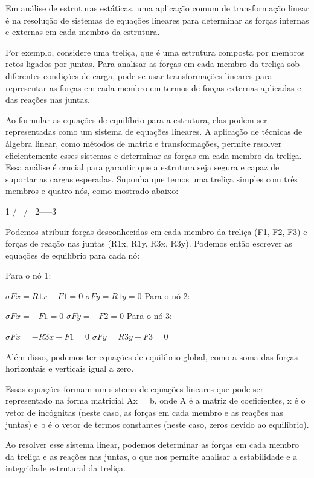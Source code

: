 Em análise de estruturas estáticas, uma aplicação comum de transformação linear é na resolução de sistemas de equações lineares para determinar as forças internas e externas em cada membro da estrutura.

Por exemplo, considere uma treliça, que é uma estrutura composta por membros retos ligados por juntas. Para analisar as forças em cada membro da treliça sob diferentes condições de carga, pode-se usar transformações lineares para representar as forças em cada membro em termos de forças externas aplicadas e das reações nas juntas.
 
Ao formular as equações de equilíbrio para a estrutura, elas podem ser representadas como um sistema de equações lineares. A aplicação de técnicas de álgebra linear, como métodos de matriz e transformações, permite resolver eficientemente esses sistemas e determinar as forças em cada membro da treliça. Essa análise é crucial para garantir que a estrutura seja segura e capaz de suportar as cargas esperadas.
	Suponha que temos uma treliça simples com três membros e quatro nós, como mostrado abaixo:

   1
  / \
 /   \
2-----3

Podemos atribuir forças desconhecidas em cada membro da treliça (F1, F2, F3) e forças de reação nas juntas (R1x, R1y, R3x, R3y). Podemos então escrever as equações de equilíbrio para cada nó:

Para o nó 1:

$\sigma Fx = R1x - F1 = 0$
$\sigma Fy = R1y = 0$
Para o nó 2:

$\sigma Fx = -F1 = 0$
$\sigma Fy = -F2 = 0$
Para o nó 3:

$\sigma Fx = -R3x + F1 = 0$
$\sigma Fy = R3y - F3 = 0$

Além disso, podemos ter equações de equilíbrio global, como a soma das forças horizontais e verticais igual a zero.

Essas equações formam um sistema de equações lineares que pode ser representado na forma matricial Ax = b, onde A é a matriz de coeficientes, x é o vetor de incógnitas (neste caso, as forças em cada membro e as reações nas juntas) e b é o vetor de termos constantes (neste caso, zeros devido ao equilíbrio).

	Ao resolver esse sistema linear, podemos determinar as forças em cada membro da treliça e as reações nas juntas, o que nos permite analisar a estabilidade e a integridade estrutural da treliça.






 

